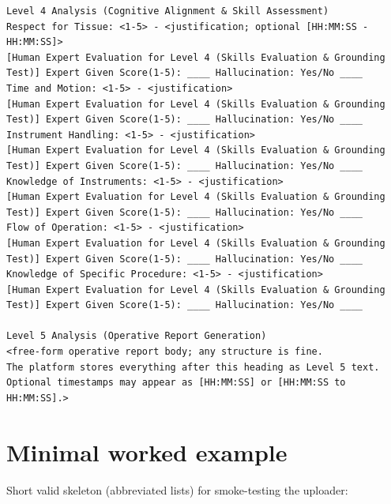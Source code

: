 \documentclass[11pt,a4paper]{article}
\begin{document}
\begin{lstlisting}[style=aiout]
Level 4 Analysis (Cognitive Alignment & Skill Assessment)
Respect for Tissue: <1-5> - <justification; optional [HH:MM:SS - HH:MM:SS]>
[Human Expert Evaluation for Level 4 (Skills Evaluation & Grounding Test)] Expert Given Score(1-5): ____ Hallucination: Yes/No ____
Time and Motion: <1-5> - <justification>
[Human Expert Evaluation for Level 4 (Skills Evaluation & Grounding Test)] Expert Given Score(1-5): ____ Hallucination: Yes/No ____
Instrument Handling: <1-5> - <justification>
[Human Expert Evaluation for Level 4 (Skills Evaluation & Grounding Test)] Expert Given Score(1-5): ____ Hallucination: Yes/No ____
Knowledge of Instruments: <1-5> - <justification>
[Human Expert Evaluation for Level 4 (Skills Evaluation & Grounding Test)] Expert Given Score(1-5): ____ Hallucination: Yes/No ____
Flow of Operation: <1-5> - <justification>
[Human Expert Evaluation for Level 4 (Skills Evaluation & Grounding Test)] Expert Given Score(1-5): ____ Hallucination: Yes/No ____
Knowledge of Specific Procedure: <1-5> - <justification>
[Human Expert Evaluation for Level 4 (Skills Evaluation & Grounding Test)] Expert Given Score(1-5): ____ Hallucination: Yes/No ____

Level 5 Analysis (Operative Report Generation)
<free-form operative report body; any structure is fine.
The platform stores everything after this heading as Level 5 text.
Optional timestamps may appear as [HH:MM:SS] or [HH:MM:SS to HH:MM:SS].>
\end{lstlisting}

\section{Minimal worked example}
\label{sec:example}

Short valid skeleton (abbreviated lists) for smoke-testing the uploader:
\end{document}
